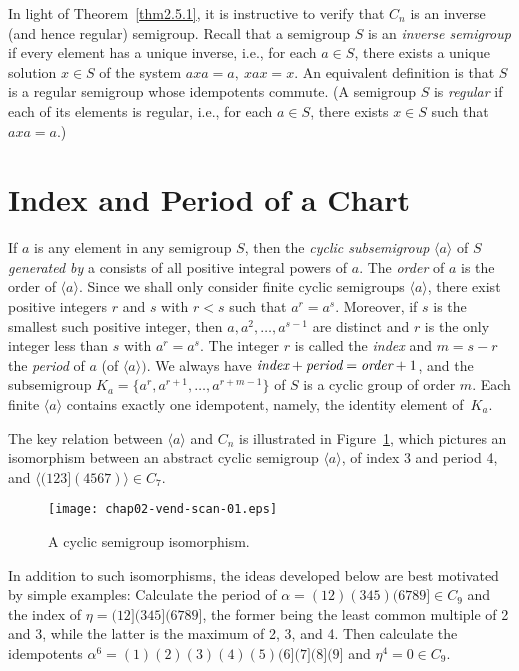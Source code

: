 \documentclass{surv-l}
\numberwithin{equation}{section}
\numberwithin{table}{section}
\numberwithin{figure}{section}
\theoremstyle{plain}
\theoremstyle{definition}
\begin{document}
In light of Theorem~\ref{thm2.5.1}, it is instructive to verify
that $C_{n}$ is an inverse (and hence regular) semigroup. Recall
that a semigroup $S$ is an \emph{inverse semigroup} if every element has a unique inverse, i.e., for each
$a\in S$, there exists a unique solution $x\in S$ of the system
$axa=a,\ xax=x$. An equivalent definition is that $S$ is a regular
semigroup whose idempotents commute. (A semigroup $S$ is
\emph{regular} if each of its elements is regular,
i.e., for each $a\in S$, there exists $x\in S$ such that $axa=a.$)

\section{Index and Period of a Chart}\label{sec2.6}

If $a$ is any element in any semigroup $S$, then the \emph{cyclic
subsemigroup} $\langle a\rangle$ of $S$ \emph{generated by} a
consists of all positive integral powers of $a$. The \emph{order}
of $a$ is the order of $\langle a\rangle$. Since we shall only
consider finite cyclic semigroups $\langle a\rangle$, there exist
positive integers $r$ and $s$ with $r<s$ such that $a^{r}=a^{s}$.
Moreover, if $s$ is the smallest such positive integer, then
$a,a^{2},\ldots,a^{s-1}$ are distinct and $r$ is the only integer
less than $s$ with $a^{r}=a^{s}$. The integer $r$ is called the
\emph{index} and $m=s-r$ the
\emph{period} of $a$ (of $\langle a\rangle)$. We
always have $\emph{index} +\emph{period}
=\emph{order}+1$, and the subsemigroup
$K_{a}=\{a^{r},a^{r+1},\ldots, a^{r+m-1}\}$ of $S$ is a cyclic
group of order $m$. Each finite $\langle a\rangle$ contains
exactly one idempotent, namely, the identity element of~$K_{a}$.

The key relation between $\langle a\rangle$ and $C_{n}$ is
illustrated in Figure~\ref{fig2.6.1}, which pictures an
isomorphism between an abstract cyclic semigroup $\langle
a\rangle$, of index 3 and period 4, and
$\langle(123](4567)\rangle\in C_{7}$.

\begin{figure}[!h]
\texttt{[image: chap02-vend-scan-01.eps]}
\caption{A cyclic semigroup isomorphism.}\label{fig2.6.1}
\end{figure}

In addition to such isomorphisms, the ideas developed below are
best motivated by simple examples: Calculate the period of
$\alpha=(12)(345)(6789]\in C_{9}$ and the index of
$\eta=(12](345](6789]$, the former being the least common multiple
of 2 and 3, while the latter is the maximum of 2, 3, and 4. Then
calculate the idempotents $\alpha^{6}=(1)(2)(3)(4)(5)(6](7](8](9]$
and $\eta^{4}=0\in C_{9}$.
\end{document}
